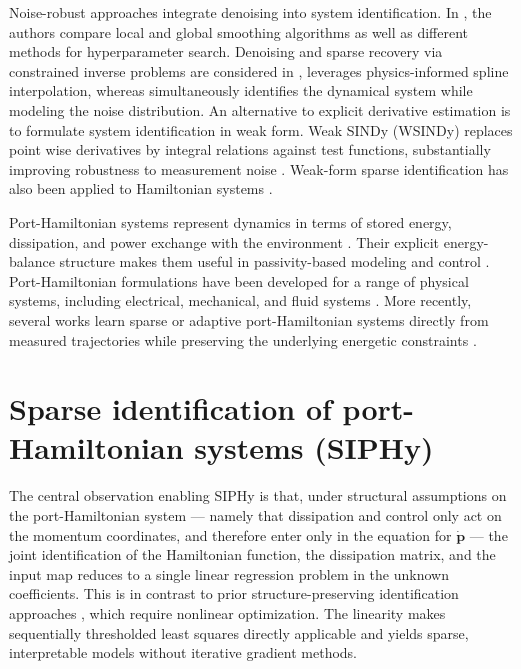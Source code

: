 \documentclass[11pt, a4paper]{article}
\theoremstyle{plain}
\theoremstyle{definition}
\theoremstyle{remark}
\begin{document}
Noise-robust approaches integrate denoising into system identification. In \cite{cortiellaPrioriDenoisingStrategies2022}, the authors compare local and global smoothing algorithms as well as different methods for hyperparameter search.  Denoising and sparse recovery via constrained inverse problems are considered in \cite{hokansonSimultaneousIdentificationDenoising2023},  \cite{sunPhysicsinformedSplineLearning2021} leverages physics-informed spline interpolation, whereas \cite{kahemanAutomaticDifferentiationSimultaneously2022} simultaneously identifies the dynamical system while modeling the noise distribution. An alternative to explicit derivative estimation is to formulate system identification in weak form. Weak SINDy (WSINDy) replaces point wise derivatives by integral relations against test functions, substantially improving robustness to measurement noise \cite{messenger2021weak}. Weak-form sparse identification has also been applied to Hamiltonian systems \cite{messengerCoarseGrainingHamiltonianSystems2023}.

Port-Hamiltonian systems represent dynamics in terms of stored energy, dissipation, and power exchange with the environment \cite{schaftPortHamiltonianSystemsTheory2014}. Their explicit energy-balance structure makes them useful in passivity-based modeling and control \cite{ortegaInterconnectionDampingAssignment2002,schaftPortHamiltonianSystemsTheory2014}. Port-Hamiltonian formulations have been developed for a range of physical systems, including electrical, mechanical, and fluid systems \cite{escobarHamiltonianViewpointModeling1999,rashadPortHamiltonianModelingIdeal2021,forniPortHamiltonianFormulationRigidBody2015a}. More recently, several works learn sparse or adaptive port-Hamiltonian systems directly from measured trajectories while preserving the underlying energetic constraints \cite{rettbergDatadrivenIdentificationLatent2024,junkerAdaptiveDataDrivenModels2025}.


\section{Sparse identification of port-Hamiltonian systems (SIPHy)}


The central observation enabling SIPHy is that, under structural assumptions on the port-Hamiltonian system — namely that dissipation and control only act on the momentum coordinates, and therefore enter only in the equation for $\dot{\mathbf{p}}$ — the joint identification of the Hamiltonian function, the dissipation matrix, and the input map reduces to a single linear regression problem in the unknown coefficients. This is in contrast to prior structure-preserving identification approaches \cite{leeStructurepreservingSparseIdentification2022, holmsenPseudoHamiltonianSystemIdentification2024}, which require nonlinear optimization. The linearity makes sequentially thresholded least squares directly applicable and yields sparse, interpretable models without iterative gradient methods.
\end{document}
